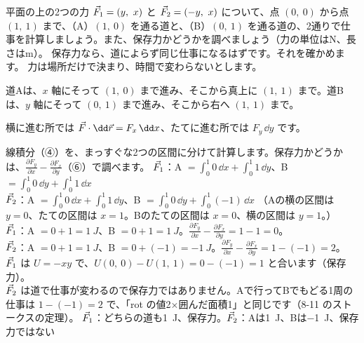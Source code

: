 \label{ph:力-4:ex13}
\begin{phreidai}
平面の上の2つの力 $\pxev F_1=(y,\ x)$ と $\vec{F}_2=(-y,\ x)$ について、点 $(0,\ 0)$ から点 $(1,\ 1)$ まで、（A）$(1,\ 0)$ を通る道と、（B）$(0,\ 1)$ を通る道の、2通りで仕事を計算しましょう。また、保存力かどうかを調べましょう（力の単位はN、長さはm）。
\phbamen
保存力なら、道によらず同じ仕事になるはずです。それを確かめます。
\phmushi
力は場所だけで決まり、時間で変わらないとします。
\phzu
\noindent\begin{minipage}[c]{0.36\linewidth}\centering
{}
\end{minipage}\hfill
\begin{minipage}[c]{0.6\linewidth}\raggedright
道Aは、$x$ 軸にそって $(1,\ 0)$ まで進み、そこから真上に $(1,\ 1)$ まで。道Bは、$y$ 軸にそって $(0,\ 1)$ まで進み、そこから右へ $(1,\ 1)$ まで。\par\vspace{2pt}
横に進む所では $\pxev F\cdot\dd\pxev r=F_x\,\dd x$、たてに進む所では $F_y\,\dd y$ です。
\end{minipage}
\phriyu
線積分（④）を、まっすぐな2つの区間に分けて計算します。保存力かどうかは、$\tfrac{\partial F_y}{\partial x}-\tfrac{\partial F_x}{\partial y}$（⑥）で調べます。
\phtateru
$\vec{F}_1$：A $=\int_0^1 0\,\dd x+\int_0^1 1\,\dd y$、B $=\int_0^1 0\,\dd y+\int_0^1 1\,\dd x$\\
$\vec{F}_2$：A $=\int_0^1 0\,\dd x+\int_0^1 1\,\dd y$、B $=\int_0^1 0\,\dd y+\int_0^1(-1)\,\dd x$
\phtoku
（Aの横の区間は $y=0$、たての区間は $x=1$。Bのたての区間は $x=0$、横の区間は $y=1$。）\\
$\vec{F}_1$：A $=0+1=\qty{1}{J}$、B $=0+1=\qty{1}{J}$。$\tfrac{\partial F_y}{\partial x}-\tfrac{\partial F_x}{\partial y}=1-1=0$。\\
$\vec{F}_2$：A $=0+1=\qty{1}{J}$、B $=0+(-1)=\qty{-1}{J}$。$\tfrac{\partial F_y}{\partial x}-\tfrac{\partial F_x}{\partial y}=1-(-1)=2$。
\phtashikame
$\vec{F}_1$ は $U=-xy$ で、$U(0,\ 0)-U(1,\ 1)=0-(-1)=1$ と合います（保存力）。\\
$\vec{F}_2$ は道で仕事が変わるので保存力ではありません。Aで行ってBでもどる1周の仕事は $1-(-1)=2$ で、「rot の値2×囲んだ面積1」と同じです（8-11 のストークスの定理）。
\kotae $\vec{F}_1$：どちらの道も\qty{1}{J}、保存力。$\vec{F}_2$：Aは\qty{1}{J}、Bは\qty{-1}{J}、保存力ではない
\end{phreidai}
